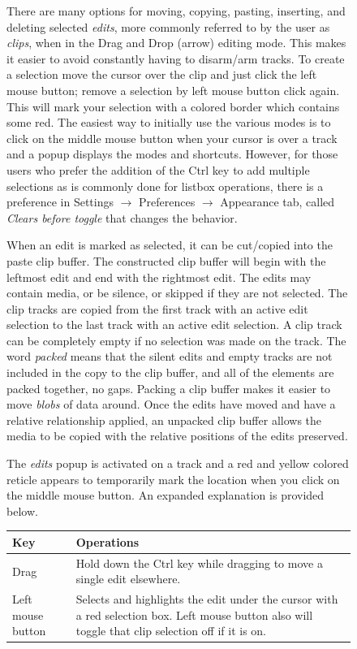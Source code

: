 \begin{figure}
There are many options for moving, copying, pasting, inserting, and deleting selected \textit{edits}, more commonly referred to by the user as \textit{clips}, when in the Drag and Drop (arrow) editing mode.  This makes it easier to avoid constantly having to disarm/arm tracks.  To create a selection move the cursor over the clip and just click the left mouse button; remove a selection by left mouse button click again.  This will mark your selection with a colored border which contains some red.  The easiest way to initially use the various modes is to click on the middle mouse button when your cursor is over a track and a popup displays the modes and shortcuts.  However, for those users who prefer the addition of the Ctrl key to add multiple selections as is commonly done for listbox operations, there is a preference in Settings $\rightarrow$ Preferences $\rightarrow$ Appearance tab, called \textit{Clears before toggle} that changes the behavior.

When an edit is marked as selected, it can be cut/copied into the paste clip buffer.  The constructed clip buffer will begin with the leftmost edit and end with the rightmost edit.  The edits may contain media, or be silence, or skipped if they are not selected.  The clip tracks are copied from the first track with an active edit selection to the last track with an active edit selection.  A clip track can be completely empty if no selection was made on the track.  The word \textit{packed} means that the silent edits and empty tracks are not included in the copy to the clip buffer, and all of the elements are packed together, no gaps.  Packing a clip buffer makes it easier to move \textit{blobs} of data around.  Once the edits have moved and have a relative relationship applied, an unpacked clip buffer allows the media to be copied with the relative positions of the edits preserved.

The \textit{edits} popup is activated on a track and a red and yellow colored reticle appears to temporarily mark the location when you click on the middle mouse button.  An expanded explanation is provided below.

\begin{center}
    \begin{tabular}{l p{12.9cm}}
        \toprule
        \textbf{Key} & \textbf{Operations} \\
        \midrule
        Drag & Hold down the Ctrl key while dragging to move a single edit elsewhere. \\
        Left mouse button & Selects and highlights the edit under the cursor with a red selection box. Left mouse button also will toggle that clip selection off if it is on. \\
        \bottomrule
    \end{tabular}
\end{center}


\end{figure}
